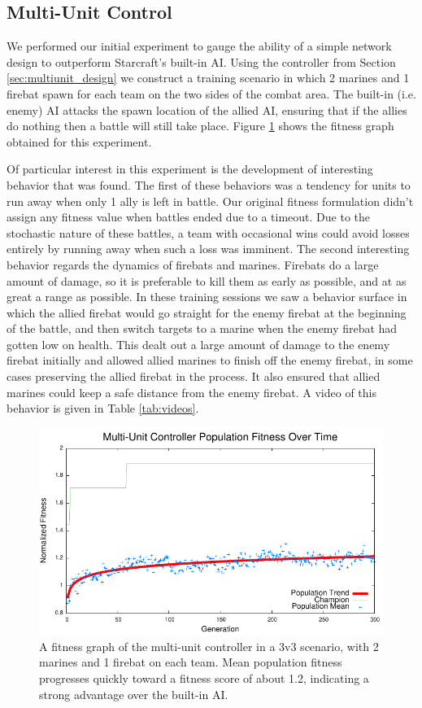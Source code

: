 \documentclass[10pt,a4paper,twocolumn]{article}
\begin{document}
\subsection{Multi-Unit Control}
\label{sec:multiunit_exp}

We performed our initial experiment to gauge the ability of a simple network design to outperform Starcraft's built-in AI. Using the controller from Section \ref{sec:multiunit_design} we construct a training scenario in which 2 marines and 1 firebat spawn for each team on the two sides of the combat area. The built-in (i.e. enemy) AI attacks the spawn location of the allied AI, ensuring that if the allies do nothing then a battle will still take place. Figure \ref{fig:multiunit_exp} shows the fitness graph obtained for this experiment.

Of particular interest in this experiment is the development of interesting behavior that was found. The first of these behaviors was a tendency for units to run away when only 1 ally is left in battle. Our original fitness formulation didn't assign any fitness value when battles ended due to a timeout. Due to the stochastic nature of these battles, a team with occasional wins could avoid losses entirely by running away when such a loss was imminent. The second interesting behavior regards the dynamics of firebats and marines. Firebats do a large amount of damage, so it is preferable to kill them as early as possible, and at as great a range as possible. In these training sessions we saw a behavior surface in which the allied firebat would go straight for the enemy firebat at the beginning of the battle, and then switch targets to a marine when the enemy firebat had gotten low on health. This dealt out a large amount of damage to the enemy firebat initially and allowed allied marines to finish off the enemy firebat, in some cases preserving the allied firebat in the process. It also ensured that allied marines could keep a safe distance from the enemy firebat. A video of this behavior is given in Table \ref{tab:videos}.

\begin{figure}
\centering
\includegraphics[scale=.59]{plots/multiunit.pdf}
\caption{A fitness graph of the multi-unit controller in a 3v3 scenario, with 2 marines and 1 firebat on each team. Mean population fitness progresses quickly toward a fitness score of about 1.2, indicating a strong advantage over the built-in AI.}
\label{fig:multiunit_exp}
\end{figure}
\end{document}
